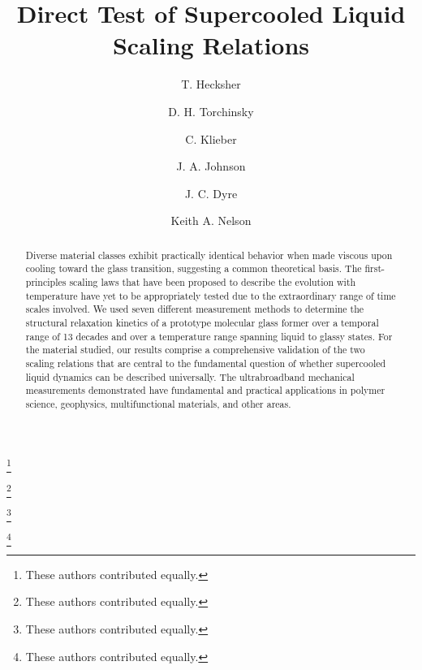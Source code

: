 \documentclass[reprint,showpacs,amsmath,amssymb,aip,jcp]{revtex4-1}
\begin{document}
\title{Direct Test of Supercooled Liquid Scaling Relations}

\author{T. Hecksher}\thanks{These authors contributed equally.}

\author{D. H. Torchinsky}\thanks{These authors contributed equally.}

\author{C. Klieber}\thanks{These authors contributed equally.}

\author{J. A. Johnson}\thanks{These authors contributed equally.}

\author{J. C. Dyre} 

\author{Keith A. Nelson} 


\begin{abstract}
  Diverse material classes exhibit practically identical behavior when
  made viscous upon cooling toward the glass transition, suggesting a
  common theoretical basis. The first-principles scaling laws that
  have been proposed to describe the evolution with temperature have
  yet to be appropriately tested due to the extraordinary range of
  time scales involved. We used seven different measurement methods to
  determine the structural relaxation kinetics of a prototype
  molecular glass former over a temporal range of 13 decades and over
  a temperature range spanning liquid to glassy states. For the
  material studied, our results comprise a comprehensive validation of
  the two scaling relations that are central to the fundamental
  question of whether supercooled liquid dynamics can be described
  universally. The ultrabroadband mechanical measurements demonstrated
  have fundamental and practical applications in polymer science,
  geophysics, multifunctional materials, and other areas.
\end{abstract}
\maketitle
\end{document}
